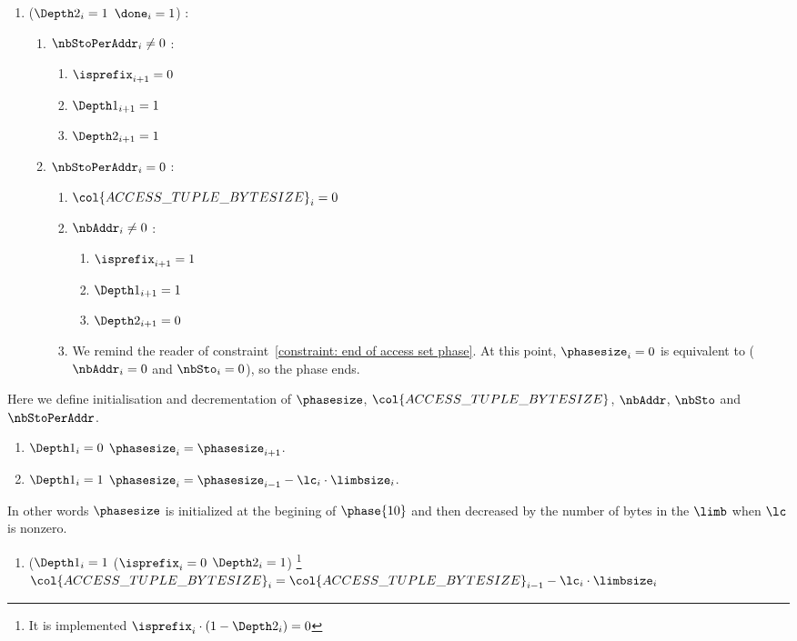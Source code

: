 \begin{enumerate}[resume]
	\item \If ($\Depth2_{i}=1$ \et $\done_{i}=1$) \Then:
	\begin{enumerate}
		\item \If $\nbStoPerAddr_{i} \neq 0$ \Then:
		\begin{enumerate}
		 	\item $\isprefix_{i+1}=0$  
		 	\item $\Depth1_{i+1}=1$ 
		 	\item $\Depth2_{i+1}=1$
		\end{enumerate}
		\item \If $\nbStoPerAddr_{i}=0$ \Then:
		\begin{enumerate}
			\item $\col{ACCESS\_TUPLE\_BYTESIZE}_{i}=0$
		 	\item \If $\nbAddr_{i} \neq 0$ \Then:
		 		\begin{enumerate}
			 		\item $\isprefix_{i+1}=1$
			 		\item $\Depth1_{i+1}=1$
			 		\item $\Depth2_{i+1}=0$
		 		\end{enumerate}
			\item \trash We remind the reader of constraint~\ref{constraint: end of access set phase}. At this point, $\phasesize_{i}=0$ is equivalent to ($\nbAddr_{i} = 0$ and $\nbSto_{i}=0$), so the phase ends.
		\end{enumerate} 
	\end{enumerate}
\end{enumerate}
Here we define initialisation and decrementation of $\phasesize$, $\col{ACCESS\_TUPLE\_BYTESIZE}$, $\nbAddr$, $\nbSto$ and $\nbStoPerAddr$.
\begin{enumerate}[resume]
    \item \If $\Depth1_{i}=0$ \Then $\phasesize_{i} = \phasesize_{i+1}$.
    \item \If $\Depth1_{i}=1$ \Then $\phasesize_{i} = \phasesize_{i-1} - \lc_{i} \cdot \limbsize_{i}$. 
\end{enumerate}
In other words $\phasesize$ is initialized at the begining of $\phase{10}$ and then decreased by the number of bytes in the $\limb$ when $\lc$ is nonzero.
\begin{enumerate}[resume]

    \item \If ($\Depth1_{i}=1$ \et ($\isprefix_{i}=0$ \Or $\Depth2_{i}=1$) \footnote{It is implemented \If $\isprefix_{i} \cdot (1 - \Depth2_{i})=0$ \Then} \Then $\col{ACCESS\_TUPLE\_BYTESIZE}_{i}=\col{ACCESS\_TUPLE\_BYTESIZE}_{i-1} - \lc_{i} \cdot \limbsize_{i}$

\end{enumerate}
